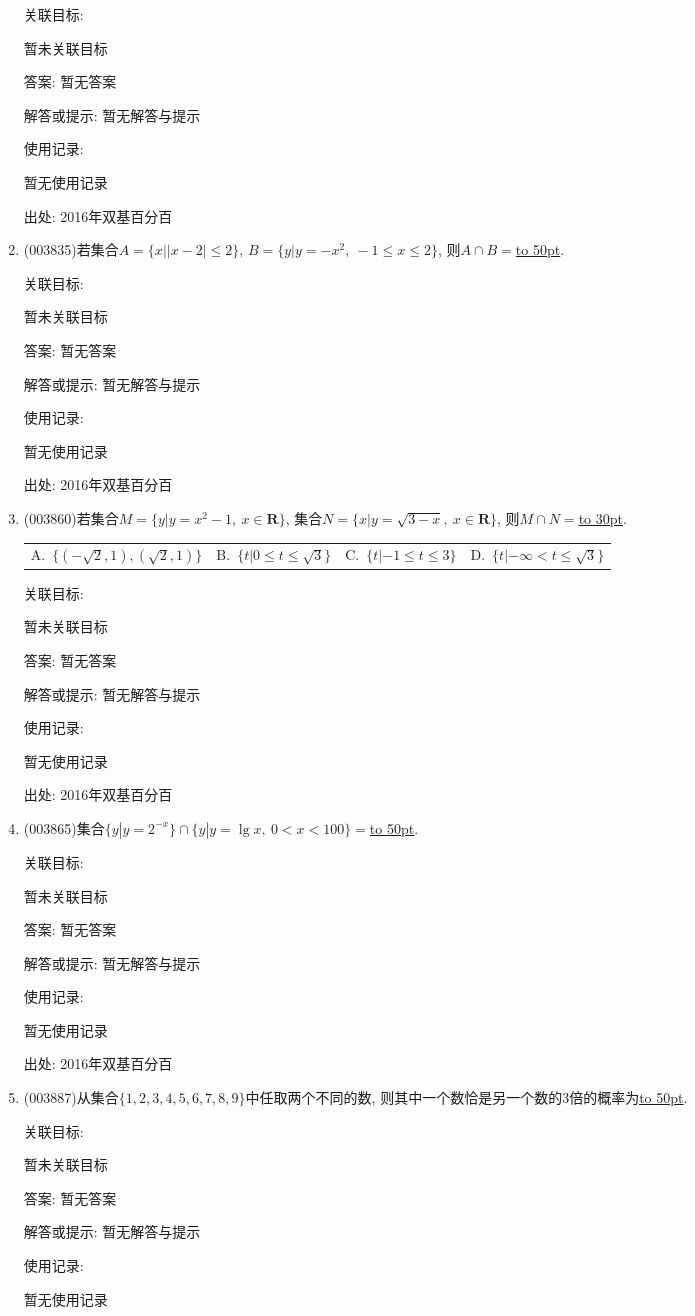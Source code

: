 \documentclass[10pt,a4paper]{article}
\newcommand{\blank}[1]{\underline{\hbox to #1pt{}}}
\newcommand{\fourch}[4]{\par\begin{tabular}{p{.23\textwidth}p{.23\textwidth}p{.23\textwidth}p{.23\textwidth}}
A.~#1 &B.~#2& C.~#3& D.~#4
\end{tabular}}
\begin{document}
\begin{enumerate}[1.]
关联目标:

暂未关联目标

答案: 暂无答案

解答或提示: 暂无解答与提示

使用记录:

暂无使用记录


出处: 2016年双基百分百
\item { (003835)}若集合$A=\{x||x-2|\le 2\}$, $B=\{y|y=-x^2, \ -1\le x\le 2\}$, 则$A\cap B=$\blank{50}.


关联目标:

暂未关联目标

答案: 暂无答案

解答或提示: 暂无解答与提示

使用记录:

暂无使用记录


出处: 2016年双基百分百
\item { (003860)}若集合$M=\{y|y=x^2-1, \ x\in \mathbf{R}\}$, 集合$N=\{x|y=\sqrt{3-x}, \ x\in \mathbf{R}\}$, 则$M\cap N=$\blank{30}.
\fourch{$\{(-\sqrt{2},1),(\sqrt{2},1)\}$}{$\{t|0\le t\le \sqrt{3}\}$}{$\{t|-1\le t\le 3\}$}{$\{t|-\infty<t\le \sqrt{3}\}$}


关联目标:

暂未关联目标

答案: 暂无答案

解答或提示: 暂无解答与提示

使用记录:

暂无使用记录


出处: 2016年双基百分百
\item { (003865)}集合$\{y|y=2^{-x}\}\cap\{y|y=\lg x, \ 0<x<100\}=$\blank{50}.


关联目标:

暂未关联目标

答案: 暂无答案

解答或提示: 暂无解答与提示

使用记录:

暂无使用记录


出处: 2016年双基百分百
\item { (003887)}从集合$\{1,2,3,4,5,6,7,8,9\}$中任取两个不同的数, 则其中一个数恰是另一个数的$3$倍的概率为\blank{50}.


关联目标:

暂未关联目标

答案: 暂无答案

解答或提示: 暂无解答与提示

使用记录:

暂无使用记录



\end{enumerate}
\end{document}
